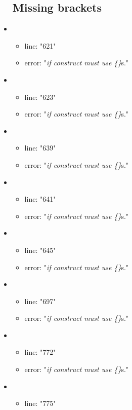 \begin{itemize}
\subsection{Missing brackets} %
\label{sub:missing_brackets}

	\item 
	\begin{itemize} 
		\item line: "621" 
		\item error: "\emph{if construct must use \{\}}s." 
	\end{itemize}
	\item 
	\begin{itemize} 
		\item line: "623" 
		\item error: "\emph{if construct must use \{\}}s." 
	\end{itemize}
	\item 
	\begin{itemize} 
		\item line: "639" 
		\item error: "\emph{if construct must use \{\}}s." 
	\end{itemize}
	\item 
	\begin{itemize} 
		\item line: "641" 
		\item error: "\emph{if construct must use \{\}}s." 
	\end{itemize}
	\item 
	\begin{itemize} 
		\item line: "645" 
		\item error: "\emph{if construct must use \{\}}s." 
	\end{itemize}
	\item 
	\begin{itemize} 
		\item line: "697" 
		\item error: "\emph{if construct must use \{\}}s." 
	\end{itemize}
	\item 
	\begin{itemize} 
		\item line: "772" 
		\item error: "\emph{if construct must use \{\}}s." 
	\end{itemize}
	\item 
	\begin{itemize} 
		\item line: "775" 

\end{itemize}
\end{itemize}
